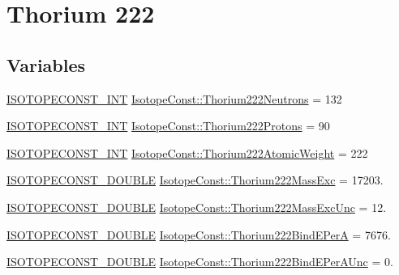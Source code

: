 \hypertarget{group___isotope_const-_thorium-_th222}{}\section{Thorium 222}
\label{group___isotope_const-_thorium-_th222}
\subsection*{Variables}
\begin{DoxyCompactItemize}
\item 
\mbox{\hyperlink{group___isotope_const-_macros_ga5f18360b3e99483a35c32d789e62621c}{I\+S\+O\+T\+O\+P\+E\+C\+O\+N\+S\+T\+\_\+\+I\+NT}} \mbox{\hyperlink{group___isotope_const-_thorium-_th222_ga621b0e609516dd0380e581e531228f46}{Isotope\+Const\+::\+Thorium222\+Neutrons}} = 132
\item 
\mbox{\hyperlink{group___isotope_const-_macros_ga5f18360b3e99483a35c32d789e62621c}{I\+S\+O\+T\+O\+P\+E\+C\+O\+N\+S\+T\+\_\+\+I\+NT}} \mbox{\hyperlink{group___isotope_const-_thorium-_th222_ga959a6486b70bd3894c52354f434da0e7}{Isotope\+Const\+::\+Thorium222\+Protons}} = 90
\item 
\mbox{\hyperlink{group___isotope_const-_macros_ga5f18360b3e99483a35c32d789e62621c}{I\+S\+O\+T\+O\+P\+E\+C\+O\+N\+S\+T\+\_\+\+I\+NT}} \mbox{\hyperlink{group___isotope_const-_thorium-_th222_ga14046931cce96cff2f79173b25702cad}{Isotope\+Const\+::\+Thorium222\+Atomic\+Weight}} = 222
\item 
\mbox{\hyperlink{group___isotope_const-_macros_ga8f45a7272ce02c0b4c65c44636ed719a}{I\+S\+O\+T\+O\+P\+E\+C\+O\+N\+S\+T\+\_\+\+D\+O\+U\+B\+LE}} \mbox{\hyperlink{group___isotope_const-_thorium-_th222_ga5a7e465f2b2ad74711938283f7d415fa}{Isotope\+Const\+::\+Thorium222\+Mass\+Exc}} = 17203.
\item 
\mbox{\hyperlink{group___isotope_const-_macros_ga8f45a7272ce02c0b4c65c44636ed719a}{I\+S\+O\+T\+O\+P\+E\+C\+O\+N\+S\+T\+\_\+\+D\+O\+U\+B\+LE}} \mbox{\hyperlink{group___isotope_const-_thorium-_th222_ga5a1445b506beffa12f1105158c8a1e48}{Isotope\+Const\+::\+Thorium222\+Mass\+Exc\+Unc}} = 12.
\item 
\mbox{\hyperlink{group___isotope_const-_macros_ga8f45a7272ce02c0b4c65c44636ed719a}{I\+S\+O\+T\+O\+P\+E\+C\+O\+N\+S\+T\+\_\+\+D\+O\+U\+B\+LE}} \mbox{\hyperlink{group___isotope_const-_thorium-_th222_gaabe5ee372203299866e88fc49b273673}{Isotope\+Const\+::\+Thorium222\+Bind\+E\+PerA}} = 7676.
\item 
\mbox{\hyperlink{group___isotope_const-_macros_ga8f45a7272ce02c0b4c65c44636ed719a}{I\+S\+O\+T\+O\+P\+E\+C\+O\+N\+S\+T\+\_\+\+D\+O\+U\+B\+LE}} \mbox{\hyperlink{group___isotope_const-_thorium-_th222_ga9c40acb56961de10cef6914a62951ef7}{Isotope\+Const\+::\+Thorium222\+Bind\+E\+Per\+A\+Unc}} = 0.

\end{DoxyCompactItemize}
